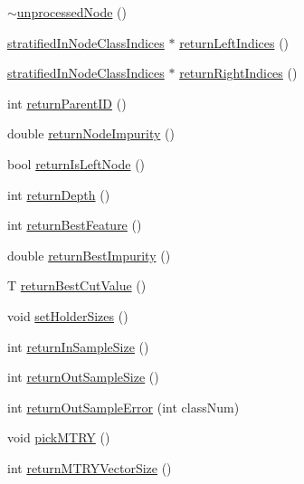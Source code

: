 \begin{DoxyCompactItemize}
\item 
\hyperlink{classfp_1_1unprocessedNode_a3242b54f6a1613c61ffa989b92501ab9}{$\sim$unprocessed\+Node} ()
\item 
\hyperlink{classfp_1_1stratifiedInNodeClassIndices}{stratified\+In\+Node\+Class\+Indices} $\ast$ \hyperlink{classfp_1_1unprocessedNode_a8738e5776d4f2da34e328196beea11a5}{return\+Left\+Indices} ()
\item 
\hyperlink{classfp_1_1stratifiedInNodeClassIndices}{stratified\+In\+Node\+Class\+Indices} $\ast$ \hyperlink{classfp_1_1unprocessedNode_a41d3bd481930201d6fc481876fd84175}{return\+Right\+Indices} ()
\item 
int \hyperlink{classfp_1_1unprocessedNode_aba68d6444ff034f7c43acaf3eeda9520}{return\+Parent\+ID} ()
\item 
double \hyperlink{classfp_1_1unprocessedNode_af44e7657d88e4a7bc61b22d97267f940}{return\+Node\+Impurity} ()
\item 
bool \hyperlink{classfp_1_1unprocessedNode_a0c26b122691d15592ce80875bf8920b5}{return\+Is\+Left\+Node} ()
\item 
int \hyperlink{classfp_1_1unprocessedNode_ac1b4cb820f5c29832f9a7ea7bf896139}{return\+Depth} ()
\item 
int \hyperlink{classfp_1_1unprocessedNode_a32e9c381659db64022fa0491de48f70c}{return\+Best\+Feature} ()
\item 
double \hyperlink{classfp_1_1unprocessedNode_a1b147714de502bcff5c727d2ce9144f8}{return\+Best\+Impurity} ()
\item 
T \hyperlink{classfp_1_1unprocessedNode_ace7db1655a4f21d4d39c989ff1db806b}{return\+Best\+Cut\+Value} ()
\item 
void \hyperlink{classfp_1_1unprocessedNode_ae1aa4f8f868fe19c8e48d3fe1e5596a8}{set\+Holder\+Sizes} ()
\item 
int \hyperlink{classfp_1_1unprocessedNode_a5243ac02610f01c6b0df9d5fd6f6f857}{return\+In\+Sample\+Size} ()
\item 
int \hyperlink{classfp_1_1unprocessedNode_a0ebfd763233eeb60b9ee6a803e2dc917}{return\+Out\+Sample\+Size} ()
\item 
int \hyperlink{classfp_1_1unprocessedNode_afbeba7b37bd021e36545af60676f05d5}{return\+Out\+Sample\+Error} (int class\+Num)
\item 
void \hyperlink{classfp_1_1unprocessedNode_a5302bdd3ad2b0de3e2fcd8ed1bf58f61}{pick\+M\+T\+RY} ()
\item 
int \hyperlink{classfp_1_1unprocessedNode_a208170fb33171f64c83839abbf300705}{return\+M\+T\+R\+Y\+Vector\+Size} ()

\end{DoxyCompactItemize}
